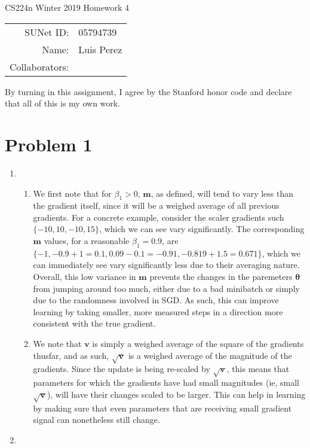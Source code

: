 \documentclass[12pt]{article}
\begin{document}
\begin{center}
{\Large CS224n Winter 2019 Homework 4}

\begin{tabular}{rl}
SUNet ID: & 05794739 \\
Name: & Luis Perez \\
Collaborators: &
\end{tabular}
\end{center}

By turning in this assignment, I agree by the Stanford honor code and declare
that all of this is my own work.

\section*{Problem 1}
\begin{enumerate}[label=(\alph*)]
  \item 
    \begin{enumerate}[label=\roman*]
      \item 
        We first note that for $\beta_1 > 0$, $\bm{m}$, as defined, will tend to vary less than the gradient itself, since it will be a weighed average of all previous gradients. For a concrete example, consider the scaler gradients such $\{ -10, 10, -10, 15\}$, which we can see vary significantly. The corresponding $\bm{m}$ values, for a reasonable $\beta_1 = 0.9$, are $\{-1, -0.9 + 1 = 0.1, 0.09 - 0.1 = -0.91, -0.819 + 1.5 = 0.671 \}$, which we can immediately see vary significantly less due to their averaging nature. Overall, this low variance in $\bm{m}$ prevents the changes in the paremeters $\bm{\theta}$ from jumping around too much, either due to a bad minibatch or simply due to the randomness involved in SGD. As such, this can improve learning by taking smaller, more measured steps in a direction more consistent with the true gradient.
      \item
        We note that $\bm{v}$ is simply a weighed average of the square of the gradients thusfar, and as such, $\sqrt{\bm{v}}$ is a weighed average of the magnitude of the gradients. Since the update is being re-scaled by $\sqrt{\bm{v}}$, this means that parameters for which the gradients have had small magnitudes (ie, small $\sqrt{\bm{v}}$), will have their changes scaled to be larger. This can help in learning by making sure that even parameters that are receiving small gradient signal can nonetheless still change.
    \end{enumerate}
    \item 

\end{enumerate}
\end{document}
